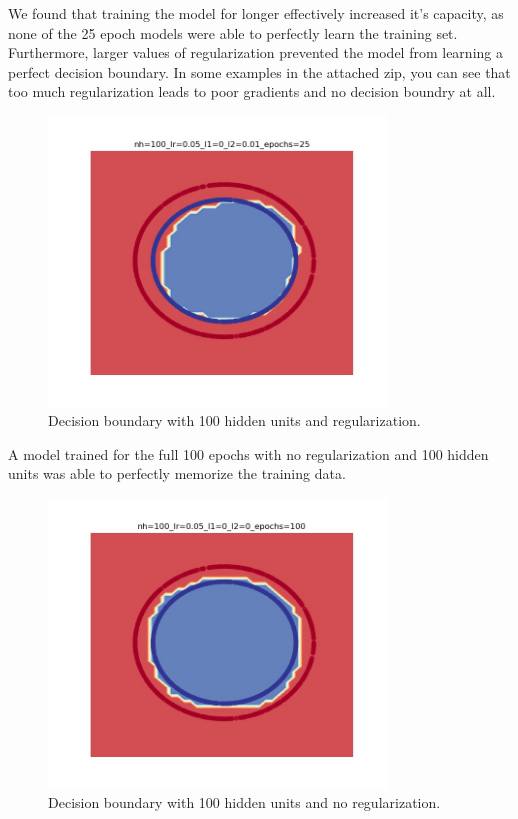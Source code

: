 \documentclass[reqno]{amsart}
\theoremstyle{definition}
\theoremstyle{remark}
\numberwithin{equation}{section}
\begin{document}
We found that training the model for longer effectively increased it's capacity, as none of the 25 epoch models were able to perfectly learn the training set. Furthermore, larger values of regularization prevented the model from learning a perfect decision boundary. In some examples in the attached zip, you can see that too much regularization leads to poor gradients and no decision boundry at all. \\

\begin{figure}[H]
    \centering
    \includegraphics[width=0.8\textwidth]{decision_medium.jpg}
    \caption{Decision boundary with 100 hidden units and regularization.}
    \label{fig:decision_medium}
\end{figure}

A model trained for the full 100 epochs with no regularization and 100 hidden units was able to perfectly memorize the training data. \\

\begin{figure}[H]
    \centering
    \includegraphics[width=0.8\textwidth]{decision_good.jpg}
    \caption{Decision boundary with 100 hidden units and no regularization.}
    \label{fig:decision_good}
\end{figure}
\end{document}
